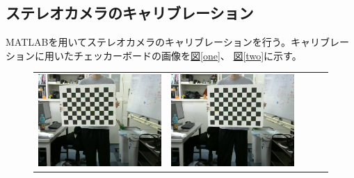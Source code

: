 \documentclass[]{jarticle}          %
\begin{document}
\subsection{ステレオカメラのキャリブレーション}
MATLABを用いてステレオカメラのキャリブレーションを行う。キャリブレーションに用いたチェッカーボードの画像を\hyperref[one]{図\ref{one}}、
\hyperref[two]{図\ref{two}}に示す。
\begin{figure}[!ht]
  \begin{center}
    \begin{tabular}{ccccc}
      \includegraphics[keepaspectratio, scale=0.1]{figures/carib/camera1/1.png}&
      \includegraphics[keepaspectratio, scale=0.1]{figures/carib/camera1/2.png}&

\end{tabular}
\end{center}
\end{figure}
\end{document}
